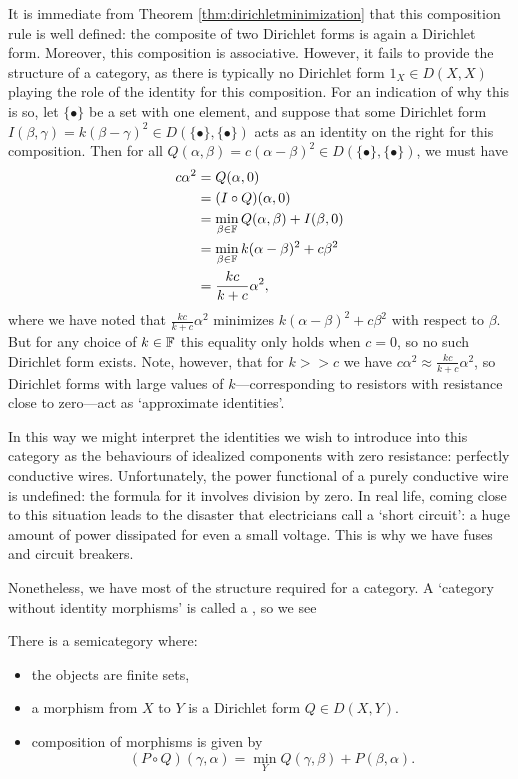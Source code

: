 It is immediate from Theorem \ref{thm:dirichletminimization} that this
composition rule is well defined: the composite of two Dirichlet forms is again
a Dirichlet form. Moreover, this composition is associative. However, it fails
to provide the structure of a category, as there is typically no Dirichlet form
$1_X \in D(X,X)$ playing the role of the identity for this composition. For an
indication of why this is so, let $\{\bullet\}$ be a set with one element, and
suppose that some Dirichlet form $I(\beta,\gamma) = k(\beta-\gamma)^2 \in
D(\{\bullet\},\{\bullet\})$ acts as an identity on the right for this
composition. Then for all $Q(\alpha,\beta) = c(\alpha-\beta)^2 \in
D(\{\bullet\},\{\bullet\})$, we must have
\begin{align*}
  c\alpha^2 &= Q(\alpha,0) \\
  &= (I \circ Q)(\alpha,0) \\ 
  &= \min_{\beta \in {\mathbb F}} Q(\alpha, \beta) + I(\beta,0) \\
  &= \min_{\beta \in {\mathbb F}} k(\alpha-\beta)^2 + c\beta^2 \\
  &= \frac{kc}{k+c}\alpha^2,
\end{align*}
where we have noted that $\frac{kc}{k+c}\alpha^2$ minimizes $k(\alpha-\beta)^2 +
c\beta^2$ with respect to $\beta$. But for any choice of $k \in {\mathbb F}$ this
equality only holds when $c = 0$, so no such Dirichlet form exists. Note,
however, that for $k>> c$ we have $c\alpha^2 \approx \frac{kc}{k+c}\alpha^2$, so
Dirichlet forms with large values of $k$---corresponding to resistors with
resistance close to zero---act as `approximate identities'.

In this way we might interpret the identities we wish to introduce
into this category as the behaviours of idealized components with zero
resistance: perfectly conductive wires. Unfortunately, the power functional of a
purely conductive wire is undefined: the formula for it involves division by
zero.  In real life, coming close to this situation leads to the disaster that
electricians call a `short circuit': a huge amount of power dissipated for even
a small voltage.  This is why we have fuses and circuit breakers.

Nonetheless, we have most of the structure required for a category. A `category
without identity morphisms' is called a , so we see
\begin{proposition}
There is a semicategory where:
\begin{itemize}
\item the objects are finite sets,

\item a morphism from $X$ to $Y$ is a Dirichlet form $Q \in D(X,Y)$.  

\item composition of morphisms is given by 
\[
(P \circ Q)(\gamma, \alpha) = \min_{Y} Q(\gamma, \beta) + P(\beta, \alpha).
\]

\end{itemize}
\end{proposition}


